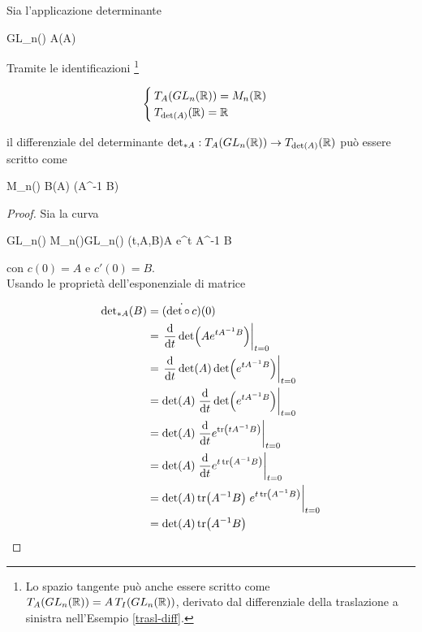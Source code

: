 \begin{corollary}\label{cor:det-diff}
	Sia l'applicazione determinante
	
	\map{\det}
		{GL_{n}(\R)}{\R}
		{A}{\det(A)}
		
	Tramite le identificazioni \footnote{%
		Lo spazio tangente può anche essere scritto come $ T_{A}(GL_{n}(\mathbb{R})) = A \, T_{I}(GL_{n}(\mathbb{R})) $, derivato dal differenziale della traslazione a sinistra nell'Esempio \ref{trasl-diff}.%
	}
	
	\begin{equation}
		\begin{cases}
			T_{A}(GL_{n}(\mathbb{R})) = M_{n}(\mathbb{R}) \\
			T_{\det(A)}(\mathbb{R}) = \mathbb{R}
		\end{cases}
	\end{equation}

	il differenziale del determinante $ \det_{*A} : T_{A}(GL_{n}(\mathbb{R})) \to T_{\det(A)}(\mathbb{R}) $ può essere scritto come

		{M_{n}(\R)}{\R}
		{B}{\det(A) \tr(A^{-1} B)}
\end{corollary}

\begin{proof}
	Sia la curva
	
	\map{c}
		{\R \times GL_{n}(\R) \times M_{n}(\R)}{GL_{n}(\R)}
		{(t,A,B)}{A e^{t A^{-1} B}}
	
	con $ c(0) = A $ e $ c'(0) = B $.\\
	Usando le proprietà dell'esponenziale di matrice
	
	\begin{align}
		\begin{split}
			{\det}_{*A}(B) &= \dot{(\det \circ \, c)} (0) \\
			&= \eval{ \dv{t} \det(A e^{t A^{-1} B}) }_{t=0} \\
			&= \eval{ \dv{t} \det(A) \det(e^{t A^{-1} B}) }_{t=0} \\
			&= \det(A) \eval{ \dv{t} \det(e^{t A^{-1} B}) }_{t=0} \\
			&= \det(A) \eval{ \dv{t} e^{\tr(t A^{-1} B)} }_{t=0} \\
			&= \det(A) \eval{ \dv{t} e^{t \tr(A^{-1} B)} }_{t=0} \\
			&= \det(A) \tr(A^{-1} B) \eval{ e^{t \tr(A^{-1} B)} }_{t=0} \\
			&= \det(A) \tr(A^{-1} B)
		\end{split}
	\end{align}
\end{proof}

